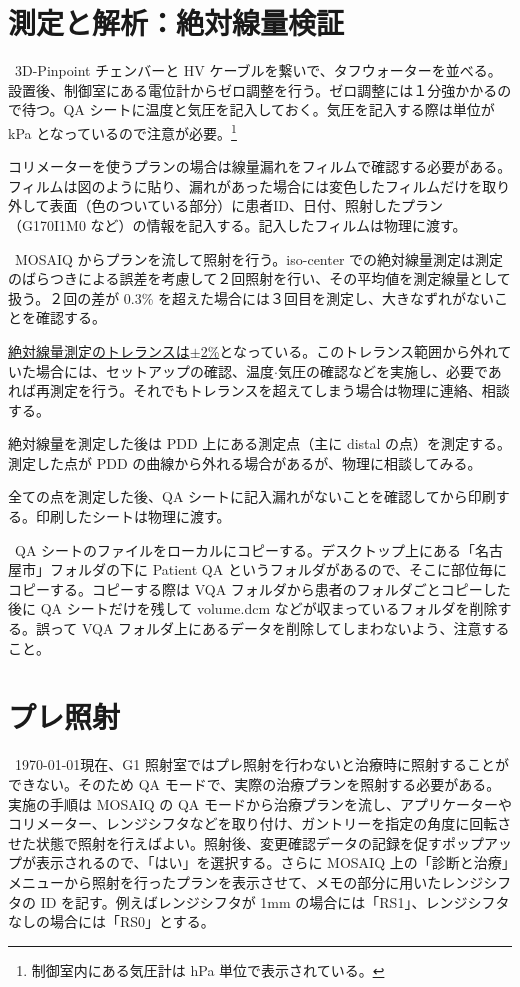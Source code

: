 \documentclass[11pt,a4paper]{jsarticle}
\newcommand{\noindot}{\noindent{$\cdot$}} %
\begin{document}
\section{測定と解析：絶対線量検証}
\noindot ~3D-Pinpoint チェンバーと HV ケーブルを繋いで、タフウォーターを並べる。設置後、制御室にある電位計からゼロ調整を行う。ゼロ調整には１分強かかるので待つ。QA シートに温度と気圧を記入しておく。気圧を記入する際は単位が kPa となっているので注意が必要。\footnote{制御室内にある気圧計は hPa 単位で表示されている。}\par
\noindot コリメーターを使うプランの場合は線量漏れをフィルムで確認する必要がある。フィルムは図のように貼り、漏れがあった場合には変色したフィルムだけを取り外して表面（色のついている部分）に患者ID、日付、照射したプラン（G170I1M0 など）の情報を記入する。記入したフィルムは物理に渡す。\par
\noindot ~MOSAIQ からプランを流して照射を行う。iso-center での絶対線量測定は測定のばらつきによる誤差を考慮して２回照射を行い、その平均値を測定線量として扱う。２回の差が 0.3\% を超えた場合には３回目を測定し、大きなずれがないことを確認する。\par
\noindot \underline{絶対線量測定のトレランスは$\pm$2\%}となっている。このトレランス範囲から外れていた場合には、セットアップの確認、温度$\cdot$気圧の確認などを実施し、必要であれば再測定を行う。それでもトレランスを超えてしまう場合は物理に連絡、相談する。\par
\noindot 絶対線量を測定した後は PDD 上にある測定点（主に distal の点）を測定する。測定した点が PDD の曲線から外れる場合があるが、物理に相談してみる。\par
\noindot 全ての点を測定した後、QA シートに記入漏れがないことを確認してから印刷する。印刷したシートは物理に渡す。\par
\noindot ~QA シートのファイルをローカルにコピーする。デスクトップ上にある「名古屋市」フォルダの下に Patient QA というフォルダがあるので、そこに部位毎にコピーする。コピーする際は VQA フォルダから患者のフォルダごとコピーした後に QA シートだけを残して volume.dcm などが収まっているフォルダを削除する。誤って VQA フォルダ上にあるデータを削除してしまわないよう、注意すること。
%
\section{プレ照射}
\noindot ~\today 現在、G1 照射室ではプレ照射を行わないと治療時に照射することができない。そのため QA モードで、実際の治療プランを照射する必要がある。実施の手順は MOSAIQ の QA モードから治療プランを流し、アプリケーターやコリメーター、レンジシフタなどを取り付け、ガントリーを指定の角度に回転させた状態で照射を行えばよい。照射後、変更確認データの記録を促すポップアップが表示されるので、「はい」を選択する。さらに MOSAIQ 上の「診断と治療」メニューから照射を行ったプランを表示させて、メモの部分に用いたレンジシフタの ID を記す。例えばレンジシフタが 1mm の場合には「RS1」、レンジシフタなしの場合には「RS0」とする。
\end{document}
